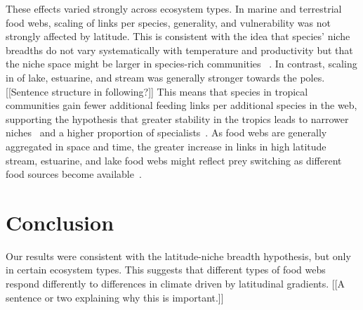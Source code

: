 \documentclass[12pt]{article}
\begin{document}
These effects varied strongly across ecosystem types. In marine and terrestrial food webs,
scaling of links per species, generality, and vulnerability was not strongly affected by
latitude. This is consistent with the idea that species' niche breadths do not vary systematically
with temperature and productivity but that the niche space might be larger in species-rich communities
~\citep{Davies2007}. In contrast, scaling in of lake, estuarine, and stream was generally stronger
towards the poles. [[Sentence structure in following?]] This means that species in tropical communities gain fewer additional feeding links
per additional species in the web, supporting the hypothesis that greater stability in the tropics
leads to narrower niches~\citep{Brown2004} and a higher proportion of specialists~\citep{}. As food webs
are generally aggregated in space and time, the greater increase in links in high latitude stream, 
estuarine, and lake food webs might reflect prey switching as different food sources become
available~\citep{}. 


\section*{Conclusion}

Our results were consistent with the latitude-niche breadth hypothesis, but only in certain ecosystem
types. This suggests that different types of food webs respond differently to differences in climate
driven by latitudinal gradients. [[A sentence or two explaining why this is important.]]


\newpage

\newpage


\end{document}
